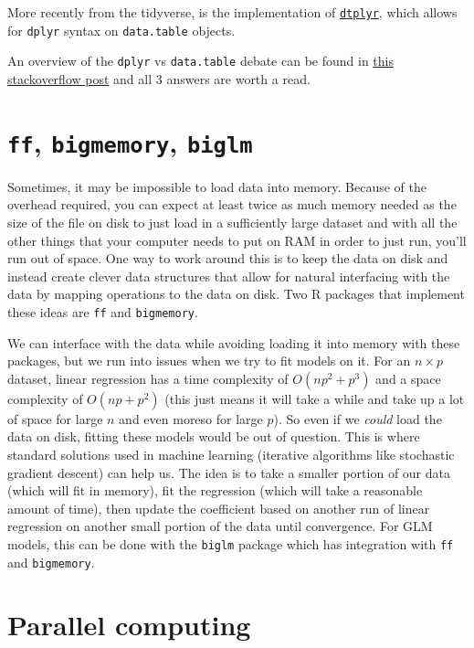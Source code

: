 \documentclass[
]{book}
\begin{document}
More recently from the tidyverse, is the implementation of \href{https://dtplyr.tidyverse.org}{\texttt{dtplyr}}, which allows for \texttt{dplyr} syntax on \texttt{data.table} objects.

An overview of the \texttt{dplyr} vs \texttt{data.table} debate can be found in \href{https://stackoverflow.com/questions/21435339/data-table-vs-dplyr-can-one-do-something-well-the-other-cant-or-does-poorly/27840349#27840349}{this stackoverflow post} and all 3 answers are worth a read.

\section{\texorpdfstring{\texttt{ff}, \texttt{bigmemory}, \texttt{biglm}}{ff, bigmemory, biglm}}\label{ff-bigmemory-biglm}

Sometimes, it may be impossible to load data into memory. Because of the overhead required, you can expect at least twice as much memory needed as the size of the file on disk to just load in a sufficiently large dataset and with all the other things that your computer needs to put on RAM in order to just run, you'll run out of space. One way to work around this is to keep the data on disk and instead create clever data structures that allow for natural interfacing with the data by mapping operations to the data on disk. Two R packages that implement these ideas are \texttt{ff} and \texttt{bigmemory}.

We can interface with the data while avoiding loading it into memory with these packages, but we run into issues when we try to fit models on it. For an \(n \times p\) dataset, linear regression has a time complexity of \(O(np^2 + p^3)\) and a space complexity of \(O(np + p^2)\) (this just means it will take a while and take up a lot of space for large \(n\) and even moreso for large \(p\)). So even if we \emph{could} load the data on disk, fitting these models would be out of question. This is where standard solutions used in machine learning (iterative algorithms like stochastic gradient descent) can help us. The idea is to take a smaller portion of our data (which will fit in memory), fit the regression (which will take a reasonable amount of time), then update the coefficient based on another run of linear regression on another small portion of the data until convergence. For GLM models, this can be done with the \texttt{biglm} package which has integration with \texttt{ff} and \texttt{bigmemory}.

\section{Parallel computing}\label{parallel-computing}
\end{document}
